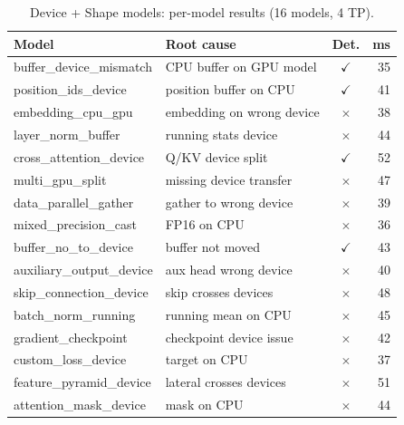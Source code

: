 \documentclass[10pt]{article}
\theoremstyle{plain}
\theoremstyle{definition}
\theoremstyle{remark}
\begin{document}
\begin{table}[t]
\centering
\caption{Device + Shape models: per-model results (16 models, 4 TP).}
\label{tab:per-model-device}
\small
\begin{tabular}{@{}llcr@{}}
\toprule
\textbf{Model} & \textbf{Root cause} & \textbf{Det.} & \textbf{ms} \\
\midrule
buffer\_device\_mismatch     & CPU buffer on GPU model   & $\checkmark$ & 35 \\
position\_ids\_device        & position buffer on CPU    & $\checkmark$ & 41 \\
embedding\_cpu\_gpu          & embedding on wrong device & $\times$     & 38 \\
layer\_norm\_buffer          & running stats device      & $\times$     & 44 \\
cross\_attention\_device     & Q/KV device split         & $\checkmark$ & 52 \\
multi\_gpu\_split            & missing device transfer   & $\times$     & 47 \\
data\_parallel\_gather       & gather to wrong device    & $\times$     & 39 \\
mixed\_precision\_cast       & FP16 on CPU               & $\times$     & 36 \\
buffer\_no\_to\_device       & buffer not moved          & $\checkmark$ & 43 \\
auxiliary\_output\_device    & aux head wrong device     & $\times$     & 40 \\
skip\_connection\_device     & skip crosses devices      & $\times$     & 48 \\
batch\_norm\_running         & running mean on CPU       & $\times$     & 45 \\
gradient\_checkpoint         & checkpoint device issue   & $\times$     & 42 \\
custom\_loss\_device         & target on CPU             & $\times$     & 37 \\
feature\_pyramid\_device     & lateral crosses devices   & $\times$     & 51 \\
attention\_mask\_device      & mask on CPU               & $\times$     & 44 \\
\bottomrule
\end{tabular}
\end{table}
\end{document}
